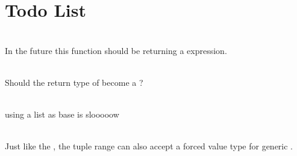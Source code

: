 \chapter{Todo List }
\hypertarget{todo}{}\label{todo}

\begin{DoxyRefList}
\item[{\parbox[t]{\linewidth}{Member \doxylink{class_eigen_1_1_transform_a41e2e58b09790eb8e3e220acceb7de1f}{Eigen::\+Transform\texorpdfstring{$<$}{<} \+\_\+\+Scalar, \+\_\+\+Dim, \+\_\+\+Mode, \+\_\+\+Options \texorpdfstring{$>$}{>}::\+Identity} ()}}]\hfill \\
\label{todo__todo000003}%
%
In the future this function should be returning a  expression.  
\item[{\parbox[t]{\linewidth}{Member \doxylink{group___geometry___module_ga033d6550c1fc82e232f2b4c380c19a54}{Eigen::\+umeyama} (const \doxylink{class_eigen_1_1_matrix_base}{Matrix\+Base$<$ Derived $>$} \&src, const \doxylink{class_eigen_1_1_matrix_base}{Matrix\+Base$<$ Other\+Derived $>$} \&dst, bool with\+\_\+scaling=true)}}]\hfill \\
\label{todo__todo000004}%
%
Should the return type of  become a ? 
\item[{\parbox[t]{\linewidth}{Member \doxylink{class_o_f_map_abc0fb953a7e84fa6480c791b7e02844a}{OFMap\texorpdfstring{$<$}{<} K, V \texorpdfstring{$>$}{>}::\+values\+\_\+} }}]\hfill \\
\label{todo__todo000001}%
%
using a list as base is slooooow  
\item[{\parbox[t]{\linewidth}{Member \doxylink{namespacevtk_ab3b536698b4a3d1ab80d9d7ba21fd5e9}{vtk::\+Data\+Array\+Tuple\+Range} (const Array\+Type\+Ptr \&array, Tuple\+Id\+Type start=-\/1, Tuple\+Id\+Type end=-\/1) -\/\texorpdfstring{$>$}{>} typename detail::\+\+Select\+Tuple\+Range$<$ Array\+Type\+Ptr, Tuple\+Size $>$::\+type}}]\hfill \\
\label{todo__todo000002}%
%
Just like the {\ttfamily {}}, the tuple range can also accept a forced value type for generic . 
\item[{\parbox[t]{\linewidth}{Member \doxylink{classvtk_g_p_u_volume_ray_cast_mapper_aafde83ea4dc23b933543ad30d370a9c7}{vtk\+GPUVolume\+Ray\+Cast\+Mapper::\+Transform\+Input} (int port)}}]\hfill \\

\end{DoxyRefList}
